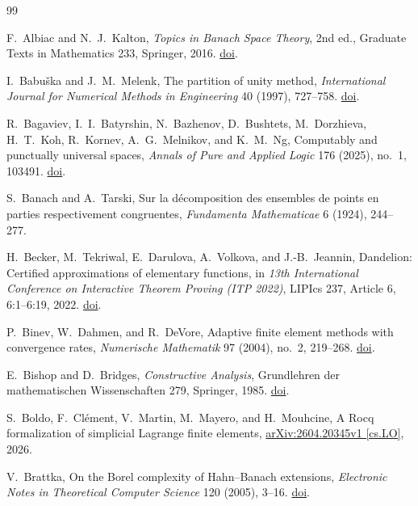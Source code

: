 \documentclass[11pt]{article}
\theoremstyle{definition}
\begin{document}
\begin{thebibliography}{99}
\footnotesize
\setlength{\itemsep}{1.5pt}
\setlength{\parsep}{0pt}

F.~Albiac and N.~J.~Kalton,
\emph{Topics in Banach Space Theory}, 2nd ed., Graduate Texts in Mathematics 233,
Springer, 2016. \href{https://doi.org/10.1007/978-3-319-31557-7}{doi}.

I.~Babu\v{s}ka and J.~M.~Melenk,
The partition of unity method,
\emph{International Journal for Numerical Methods in Engineering} 40 (1997), 727--758.
\href{https://doi.org/10.1002/(SICI)1097-0207(19970228)40:4<727::AID-NME86>3.0.CO;2-N}{doi}.

R.~Bagaviev, I.~I.~Batyrshin, N.~Bazhenov, D.~Bushtets, M.~Dorzhieva,
H.~T.~Koh, R.~Kornev, A.~G.~Melnikov, and K.~M.~Ng,
Computably and punctually universal spaces,
\emph{Annals of Pure and Applied Logic} 176 (2025), no.~1, 103491.
\href{https://doi.org/10.1016/j.apal.2024.103491}{doi}.

S.~Banach and A.~Tarski,
Sur la d\'ecomposition des ensembles de points en parties respectivement congruentes,
\emph{Fundamenta Mathematicae} 6 (1924), 244--277.

H.~Becker, M.~Tekriwal, E.~Darulova, A.~Volkova, and J.-B.~Jeannin,
Dandelion: Certified approximations of elementary functions,
in \emph{13th International Conference on Interactive Theorem Proving (ITP 2022)},
LIPIcs 237, Article 6, 6:1--6:19, 2022.
\href{https://doi.org/10.4230/LIPIcs.ITP.2022.6}{doi}.

P.~Binev, W.~Dahmen, and R.~DeVore,
Adaptive finite element methods with convergence rates,
\emph{Numerische Mathematik} 97 (2004), no.~2, 219--268.
\href{https://doi.org/10.1007/s00211-003-0492-7}{doi}.

E.~Bishop and D.~Bridges,
\emph{Constructive Analysis},
Grundlehren der mathematischen Wissenschaften 279, Springer, 1985.
\href{https://doi.org/10.1007/978-3-642-61667-9}{doi}.

S.~Boldo, F.~Cl\'ement, V.~Martin, M.~Mayero, and H.~Mouhcine,
A Rocq formalization of simplicial Lagrange finite elements,
\href{https://arxiv.org/abs/2604.20345v1}{arXiv:2604.20345v1 [cs.LO]}, 2026.

V.~Brattka,
On the Borel complexity of Hahn--Banach extensions,
\emph{Electronic Notes in Theoretical Computer Science} 120 (2005), 3--16.
\href{https://doi.org/10.1016/j.entcs.2004.07.011}{doi}.


\end{thebibliography}
\end{document}

